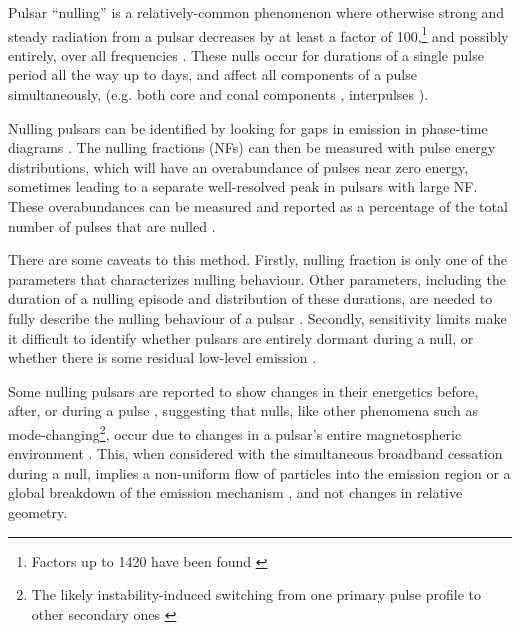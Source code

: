 \documentclass[fleqn,usenatbib]{mnras}
\begin{document}
Pulsar ``nulling'' \citep[first reported in][]{backer1970pulsar} is a relatively-common phenomenon where otherwise strong and steady radiation from a pulsar decreases by at least a factor of 100,\footnote{Factors up to 1420 have been found \citep[e.g., B1706-16, ][]{naidu2018detection}} and possibly entirely, over all frequencies \citep{ritchings1976pulsar, wang2007pulsar}. These nulls occur for durations of a single pulse period all the way up to days, and affect all components of a pulse simultaneously, (e.g. both core and conal components \citep{Rankin1986}, interpulses \citep{hankins1984psr1944+}). 

Nulling pulsars can be identified by looking for gaps in emission in phase-time diagrams \citep{wang2007pulsar}. The nulling fractions (NFs) can then be measured with pulse energy distributions, which will have an overabundance of pulses near zero energy, sometimes leading to a separate well-resolved peak in pulsars with large NF. These overabundances can be measured and reported as a percentage of the total number of pulses that are nulled \citep{ritchings1976pulsar}.

There are some caveats to this method. Firstly, nulling fraction is only one of the parameters that characterizes nulling behaviour. Other parameters, including the duration of a nulling episode and distribution of these durations, are needed to fully describe the nulling behaviour of a pulsar \citep{gajjar2012survey}. Secondly, sensitivity limits make it difficult to identify whether pulsars are entirely dormant during a null, or whether there is some residual low-level emission \citep{wang2007pulsar}. 

Some nulling pulsars are reported to show changes in their energetics before, after, or during a pulse \citep[e.g. an increase in pulse energy after a null or a slow-down rate that drops during a null,][]{backer1970pulsar,kramer2006periodically}, suggesting that nulls, like other phenomena such as mode-changing\footnote{The likely instability-induced switching from one primary pulse profile to other secondary ones \citep{wang2007pulsar}}, occur due to changes in a pulsar's entire magnetospheric environment \citep{Lyne1982, Lyne2010, GajjarJoshi2014}. This, when considered with the simultaneous broadband cessation during a null, implies a non-uniform flow of particles into the emission region or a global breakdown of the emission mechanism \citep[in a ``tipping point'' like instability, ][]{wang2007pulsar,Gajjar2014}, and not changes in relative geometry.
\end{document}
